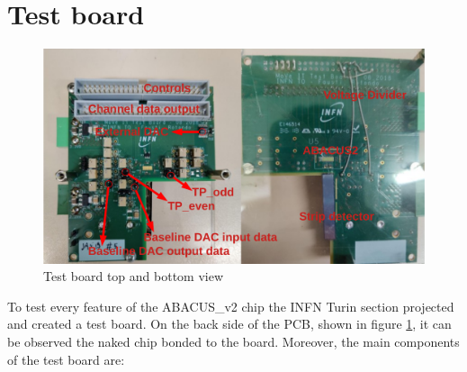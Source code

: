 \section{Test board}\label{testboard}
\begin{figure}[H]
	\centering
	\includegraphics[width=0.7\linewidth]{IMG/ch5/TESTBOARD}
	\caption{Test board top and bottom view}
	\label{fig:testboard}
\end{figure}
To test every feature of the ABACUS\_v2 chip the INFN Turin section projected and created a test board.
On the back side of the PCB, shown in figure \ref{fig:testboard}, it can be observed the naked chip bonded to the board.
Moreover, the main components of the test board are:
